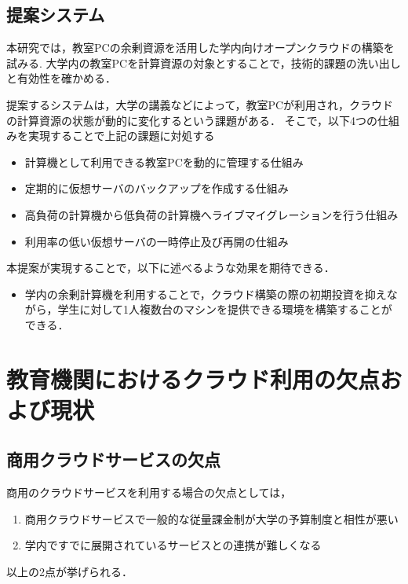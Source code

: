 \documentclass[11pt,a4paper]{jsarticle}
\begin{document}
\subsection{提案システム}
本研究では，教室PCの余剰資源を活用した学内向けオープンクラウドの構築を試みる.
大学内の教室PCを計算資源の対象とすることで，技術的課題の洗い出しと有効性を確かめる．
\par 提案するシステムは，大学の講義などによって，教室PCが利用され，クラウドの計算資源の状態が動的に変化するという課題がある．
そこで，以下4つの仕組みを実現することで上記の課題に対処する
\begin{itemize}
	\item 計算機として利用できる教室PCを動的に管理する仕組み
	\item 定期的に仮想サーバのバックアップを作成する仕組み
	\item 高負荷の計算機から低負荷の計算機へライブマイグレーションを行う仕組み
	\item 利用率の低い仮想サーバの一時停止及び再開の仕組み
\end{itemize}

\par 本提案が実現することで，以下に述べるような効果を期待できる．
\begin{itemize}
	\item 学内の余剰計算機を利用することで，クラウド構築の際の初期投資を抑えながら，学生に対して1人複数台のマシンを提供できる環境を構築することができる．
\end{itemize}


\section{教育機関におけるクラウド利用の欠点および現状}
\subsection{商用クラウドサービスの欠点}
商用のクラウドサービスを利用する場合の欠点としては，
\begin{enumerate}
	\item 商用クラウドサービスで一般的な従量課金制が大学の予算制度と相性が悪い
	\item 学内ですでに展開されているサービスとの連携が難しくなる
\end{enumerate}
以上の2点が挙げられる．
\end{document}
